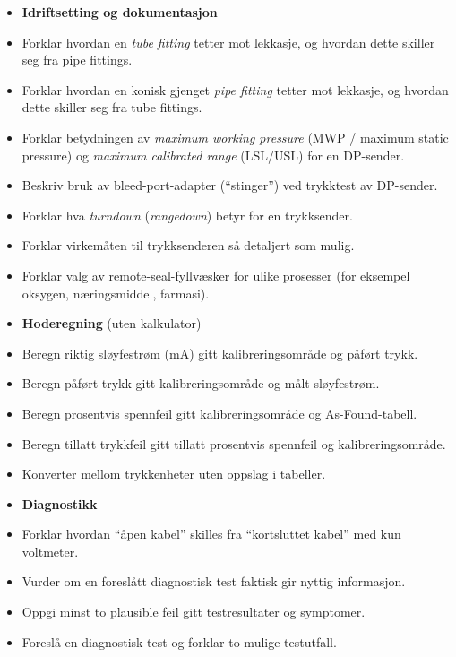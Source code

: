 \begin{itemize}
\item{} {\bf Idriftsetting og dokumentasjon}
\item{} Forklar hvordan en {\it tube fitting} tetter mot lekkasje, og hvordan dette skiller seg fra pipe fittings.
\item{} Forklar hvordan en konisk gjenget {\it pipe fitting} tetter mot lekkasje, og hvordan dette skiller seg fra tube fittings.
\item{} Forklar betydningen av {\it maximum working pressure} (MWP / maximum static pressure) og {\it maximum calibrated range} (LSL/USL) for en DP-sender.
\item{} Beskriv bruk av bleed-port-adapter (``stinger'') ved trykktest av DP-sender.
\item{} Forklar hva {\it turndown} ({\it rangedown}) betyr for en trykksender.
\item{} Forklar virkemåten til trykksenderen så detaljert som mulig.
\item{} Forklar valg av remote-seal-fyllvæsker for ulike prosesser (for eksempel oksygen, næringsmiddel, farmasi).
\end{itemize}

\filbreak

\begin{itemize}
\item{} {\bf Hoderegning} (uten kalkulator)
\item{} Beregn riktig sløyfestrøm (mA) gitt kalibreringsområde og påført trykk.
\item{} Beregn påført trykk gitt kalibreringsområde og målt sløyfestrøm.
\item{} Beregn prosentvis spennfeil gitt kalibreringsområde og As-Found-tabell.
\item{} Beregn tillatt trykkfeil gitt tillatt prosentvis spennfeil og kalibreringsområde.
\item{} Konverter mellom trykkenheter uten oppslag i tabeller.
\end{itemize}

\filbreak

\begin{itemize}
\item{} {\bf Diagnostikk}
\item{} Forklar hvordan ``åpen kabel'' skilles fra ``kortsluttet kabel'' med kun voltmeter.
\item{} Vurder om en foreslått diagnostisk test faktisk gir nyttig informasjon.
\item{} Oppgi minst to plausible feil gitt testresultater og symptomer.
\item{} Foreslå en diagnostisk test og forklar to mulige testutfall.
\end{itemize}




